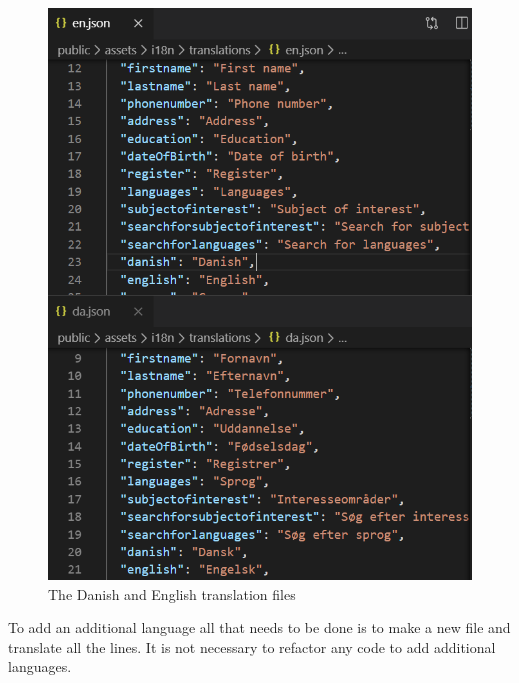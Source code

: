 \begin{figure}
    \centering
    \includegraphics[scale=0.5]{figures/translations.PNG}
    \caption{The Danish and English translation files}
    \label{fig:translationfiles}
\end{figure}
\noindent
To add an additional language all that needs to be done is to make a new file and translate all the lines. 
It is not necessary to refactor any code to add additional languages.
